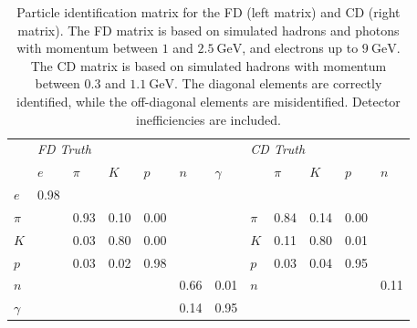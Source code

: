     \begin{table}
        \caption{Particle identification matrix for the FD (left matrix) and CD (right matrix).
        The FD matrix is based on simulated hadrons and photons with momentum between $1$ and $2.5~\text{GeV}$, and electrons up to $9~\text{GeV}$.
        The CD matrix is based on simulated hadrons with momentum between $0.3$ and $1.1~\text{GeV}$.
        The diagonal elements are correctly identified, while the off-diagonal elements are misidentified.
        Detector inefficiencies are included.}

        \begin{tabularx}{\textwidth}{XXXXXXX|XXXXX}
            \hline
                     & \multicolumn{6}{l}{\textit{FD Truth}} & \multicolumn{5}{l}{\textit{CD Truth}}  \\
            \cline{2-12}
                     & $e$      & $\pi$ & $K$  & $p$  & $n$  & $\gamma$ &       & $\pi$    & $K$  & $p$  & $n$  \\
            \hline
            $e$      & 0.98     &       &      &      &      &          &       &          &      &      &      \\
            $\pi$    &          & 0.93  & 0.10 & 0.00 &      &          & $\pi$ & 0.84     & 0.14 & 0.00 &      \\
            $K$      &          & 0.03  & 0.80 & 0.00 &      &          & $K$   & 0.11     & 0.80 & 0.01 &      \\
            $p$      &          & 0.03  & 0.02 & 0.98 &      &          & $p$   & 0.03     & 0.04 & 0.95 &      \\
            $n$      &          &       &      &      & 0.66 & 0.01     & $n$   &          &      &      & 0.11 \\
            $\gamma$ &          &       &      &      & 0.14 & 0.95     &       &          &      &      &      \\
            \hline
        \end{tabularx}
        \label{tab::rpid}
    \end{table}
